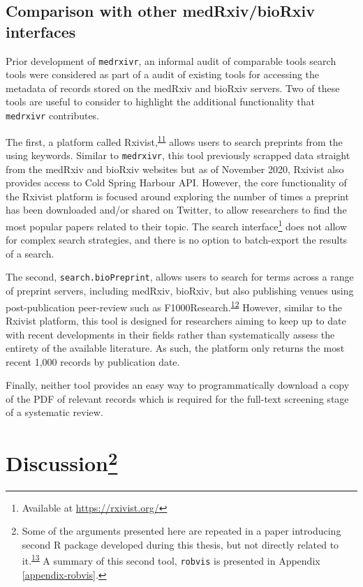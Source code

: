 \documentclass[a4paper, twoside]{templates/ociamthesis}
\begin{document}
\hypertarget{comparison-with-other-medrxivbiorxiv-interfaces}{%
\subsection{Comparison with other medRxiv/bioRxiv interfaces}\label{comparison-with-other-medrxivbiorxiv-interfaces}}

Prior development of \texttt{medrxivr}, an informal audit of comparable tools search tools were considered as part of a audit of existing tools for accessing the metadata of records stored on the medRxiv and bioRxiv servers. Two of these tools are useful to consider to highlight the additional functionality that \texttt{medrxivr} contributes.

The first, a platform called Rxivist,\textsuperscript{\protect\hyperlink{ref-abdill2019}{11}} allows users to search preprints from the using keywords. Similar to \texttt{medrxivr}, this tool previously scrapped data straight from the medRxiv and bioRxiv websites but as of November 2020, Rxivist also provides access to Cold Spring Harbour API. However, the core functionality of the Rxivist platform is focused around exploring the number of times a preprint has been downloaded and/or shared on Twitter, to allow researchers to find the most popular papers related to their topic. The search interface\footnote{Available at \url{https://rxivist.org/}} does not allow for complex search strategies, and there is no option to batch-export the results of a search.

The second, \texttt{search.bioPreprint}, allows users to search for terms across a range of preprint servers, including medRxiv, bioRxiv, but also publishing venues using post-publication peer-review such as F1000Research.\textsuperscript{\protect\hyperlink{ref-iwema2016}{12}} However, similar to the Rxivist platform, this tool is designed for researchers aiming to keep up to date with recent developments in their fields rather than systematically assess the entirety of the available literature. As such, the platform only returns the most recent 1,000 records by publication date.

Finally, neither tool provides an easy way to programmatically download a copy of the PDF of relevant records which is required for the full-text screening stage of a systematic review.

\hypertarget{discussion}{%
\section[Discussion]{\texorpdfstring{Discussion\footnote{Some of the arguments presented here are repeated in a paper introducing second R package developed during this thesis, but not directly related to it.\textsuperscript{\protect\hyperlink{ref-mcguinness}{13}} A summary of this second tool, \texttt{robvis} is presented in Appendix \ref{appendix-robvis}.}}{Discussion}}\label{discussion}}
\end{document}
